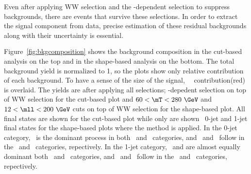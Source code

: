 Even after applying WW selection and the \mHi-dependent selection to suppress 
backgrounds, there are events that survive these selections. In order to extract 
the signal component from data, precise estimation of these residual backgrounds 
along with their uncertainty is essential. 

Figure~\ref{fig:bkgcomposition} shows the background composition in the cut-based 
analysis on the top and in the shape-based analysis on the bottom. 
The total background yield is normalized to 1, so the plots show only relative 
contribution of each background. To have a sense of the size of the signal, 
~\GeV\ contribution(red) is overlaid. The yields are after
applying all selections; \mHi-depedent selection on top of WW selection for 
the cut-based plot and $60<\mT<280~\GeV$ and $12<\mll<200~\GeV$ cuts on top of 
WW selection for the shape-based plot. All final states are shown for the
cut-based plot while only are shown \DF\ 0-jet and 1-jet final states  
for the shape-based plots where the method is applied. 
In the 0-jet category, \ww\ is the dominant process in both \DF\ and \SF\ 
categories, and \Wjets\ and \dyll\ follow in the \DF\ and \SF\ categories,
repectively. 
In the 1-jet category, \ww\ and \topbkg are almost equally dominant both \DF\ and \SF\
categories, and \Wjets\ and \dyll\ follow in the \DF\ and \SF\ categories,
repectively.
%
